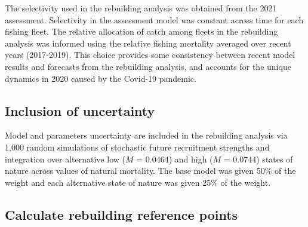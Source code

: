 \documentclass[11pt,
  english,
  a4paper,
]{article}
\begin{document}
\leavevmode\tagmcend\tagstructend


The selectivity used in the rebuilding analysis was obtained from the 2021 assessment. Selectivity in the assessment model was constant across time for each fishing fleet. The relative allocation of catch among fleets in the rebuilding analysis was informed using the relative fishing mortality averaged over recent years (2017-2019). This choice provides some consistency between recent model results and forecasts from the rebuilding analysis, and accounts for the unique dynamics in 2020 caused by the Covid-19 pandemic.

\leavevmode\tagmcend\tagstructend\par


\hypertarget{inclusion-of-uncertainty}{%
\subsection{Inclusion of uncertainty}\label{inclusion-of-uncertainty}}

\leavevmode\tagmcend\tagstructend


Model and parameters uncertainty are included in the rebuilding analysis via 1,000 random simulations of stochastic future recruitment strengths and integration over alternative low ({\(M\)\leavevmode\tagmcend\tagstructend} = 0.0464) and high ({\(M\)\leavevmode\tagmcend\tagstructend} = 0.0744) states of nature across values of natural mortality. The base model was given 50\% of the weight and each alternative state of nature was given 25\% of the weight.

\leavevmode\tagmcend\tagstructend\par


\hypertarget{calculate-rebuilding-reference-points}{%
\subsection{Calculate rebuilding reference points}\label{calculate-rebuilding-reference-points}}

\leavevmode\tagmcend\tagstructend
\end{document}
